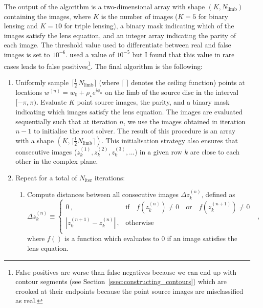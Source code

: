 \documentclass[12pt,dvipsnames]{report}
\newcommand{\hquad}{~~}
\begin{document}
The output of the algorithm is a two-dimensional array with shape $(K, N_\mathrm{limb})$ containing the 
images, where $K$ is the number of images ($K=5$ for binary lensing and $K=10$ for triple lensing), 
a binary mask indicating which of the images satisfy the lens equation, and an integer array 
indicating the parity of each image. The threshold value used to differentiate between 
real and false images is set to $10^{-6}$. \citet{2021MNRAS.503.6143K} used a value of 
$10^{-5}$ but I found that this value in rare cases leads to false positives\footnote{False 
positives are worse than false negatives because we can end up with contour segments (see
Section~\ref{ssec:constructing_contours}) which are crooked at their endpoints because 
the point source images are misclassified as real.}. 
The final algorithm is the following:
\begin{enumerate}
    \item Uniformly sample $\lceil\frac{1}{2}\,N_\mathrm{limb}\rceil$ (where $\lceil\,\rceil$ 
    denotes the ceiling function) points at locations 
    $w^{(n)}=w_0 + \rho_\star e^{i\phi_n}$ on the limb of the source disc  in 
    the interval $[-\pi,\pi)$. Evaluate $K$ point source images, the parity, and a binary
    mask indicating which images satisfy the lens equation. 
    The images are evaluated sequentially such that at iteration
    $n$, we use the images obtained in iteration $n-1$ to initialise the root solver.
    The result of this procedure is an array with a shape 
     $(K, \lceil\frac{1}{2}N_\mathrm{limb}\rceil)$. This initialisation strategy also 
     ensures that consecutive images ($z^{(1)}_k, z^{(2)}_k, z^{(3)}_k,\ldots$) 
     in a given row $k$ are close to each other in the complex plane.
    \item Repeat for a total of $N_\mathrm{iter}$ iterations:
    \begin{enumerate}
    \item Compute distances between all consecutive images $\Delta z^{(n)}_k$, defined as
    \begin{equation}
    \Delta z^{(n)}_k  \equiv 
    \begin{cases} 
    0\,,& \text{if}\quad f\left(z^{(n)}_k\right)\neq 0\quad \text{or}\quad f\left(z^{(n+1)}_k\right)\neq 0\;\text{}\\
    |z^{(n+1)}_k - z^{(n)}_k|\,,&\text{otherwise}\\
    \end{cases} 
    \hquad,
    \end{equation}
    where $f()$ is a function which evaluates to $0$ if an image satisfies the lens equation.

\end{enumerate}
\end{enumerate}
\end{document}
